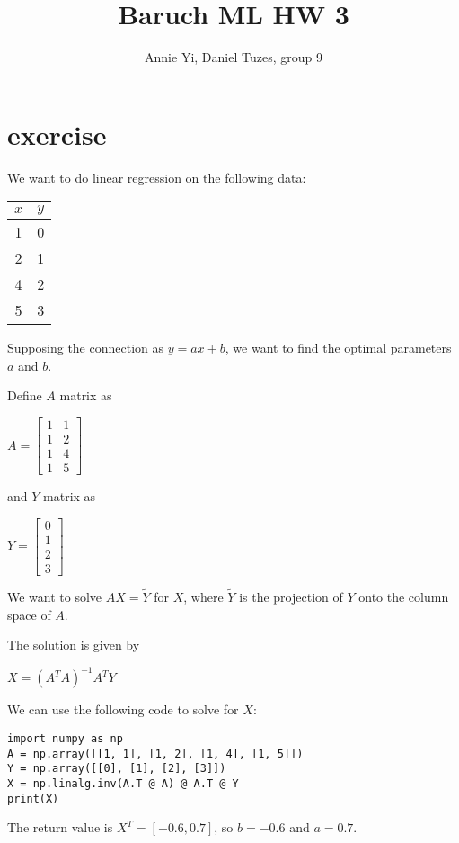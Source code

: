 \documentclass{article}
\title{Baruch ML HW 3}
\author{Annie Yi, Daniel Tuzes, group 9}
\begin{document}
\maketitle
\section{exercise}
We want to do linear regression on the following data:
\begin{center}
    \begin{tabular}{c|c}
        $x$ & $y$ \\
        \hline
        1   & 0   \\
        2   & 1   \\
        4   & 2   \\
        5   & 3   \\
    \end{tabular}
\end{center}
Supposing the connection as $y = a x + b$, we want to find the optimal parameters $a$ and $b$.

Define $A$ matrix as
\begin{center}
    $A = \begin{bmatrix}
            1 & 1 \\
            1 & 2 \\
            1 & 4 \\
            1 & 5
        \end{bmatrix}$
\end{center}
and $Y$ matrix as
\begin{center}
    $Y = \begin{bmatrix}
            0 \\
            1 \\
            2 \\
            3
        \end{bmatrix}$
\end{center}
We want to solve $AX = \tilde Y$ for $X$,
where $\tilde Y$ is the projection of $Y$ onto the column space of $A$.

The solution is given by
\begin{center}
    $X = (A^T A)^{-1} A^T Y$
\end{center}
We can use the following code to solve for $X$:
\begin{verbatim}
import numpy as np
A = np.array([[1, 1], [1, 2], [1, 4], [1, 5]])
Y = np.array([[0], [1], [2], [3]])
X = np.linalg.inv(A.T @ A) @ A.T @ Y
print(X)
\end{verbatim}
The return value is $X^T = [-0.6, 0.7]$, so $b = -0.6$ and $a = 0.7$.
\end{document}
